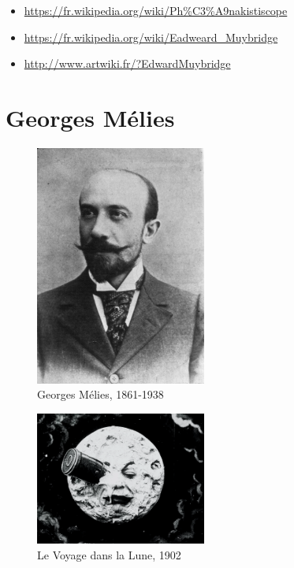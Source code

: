 \documentclass[
  french,
]{book}
\providecommand{\tightlist}{%
  \setlength{\itemsep}{0pt}\setlength{\parskip}{0pt}}
\begin{document}
\begin{itemize}
\tightlist
\item
  \url{https://fr.wikipedia.org/wiki/Ph\%C3\%A9nakistiscope}
\item
  \url{https://fr.wikipedia.org/wiki/Eadweard_Muybridge}
\item
  \url{http://www.artwiki.fr/?EdwardMuybridge}
\end{itemize}

\hypertarget{georges-muxe9lies}{%
\section{Georges Mélies}\label{georges-muxe9lies}}

\begin{figure}
\centering
\includegraphics[width=0.5\textwidth,height=\textheight]{medias/corpus/melies/George_Melies.jpg}
\caption{Georges Mélies, 1861-1938}
\end{figure}

\begin{figure}
\centering
\includegraphics[width=0.5\textwidth,height=\textheight]{medias/corpus/melies/voyage_dans_la_lune.gif}
\caption{Le Voyage dans la Lune, 1902}
\end{figure}
\end{document}
